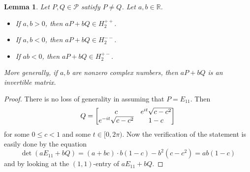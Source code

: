 \documentclass[10pt,a4paper]{amsart}
\newcommand\cP{{\mathcal{P}}}
\newtheorem{lemma}[theorem]{Lemma}
\theoremstyle{definition}
\theoremstyle{remark}
\numberwithin{subsection}{section}
\numberwithin{equation}{section}
\begin{document}
\begin{lemma}\label{apbq}
Let $P,Q\in \cP$ satisfy $P\neq Q$. Let $a,b\in \mathbb{R}$. 
\begin{itemize}
\item If $a,b>0$, then $aP+bQ\in H_2^{++}$. 
\item If $a,b<0$, then $aP+bQ\in H_2^{--}$. 
\item If $ab<0$, then $aP+bQ\in H_2^{+-}$. 
\end{itemize}
More generally, if $a,b$ are nonzero complex numbers, then $aP+bQ$ is an invertible matrix.
\end{lemma}
\begin{proof}
There is no loss of generality in assuming that $P=E_{11}$. 
Then
\[
Q=\left[ \begin{matrix} c & e^{it}\sqrt{c-c^2}  \cr e^{-it}\sqrt{c-c^2} & 1-c \cr \end{matrix} \right]
\]
for some $0\leq c<1$ and some $t\in [0,2\pi)$. 
Now the verification of the statement is easily done by the equation
\[
\det(aE_{11}+bQ) = (a+bc)\cdot b(1-c)-b^2(c-c^2) = ab(1-c)
\]
and by looking at the $(1,1)$-entry of $aE_{11}+bQ$.
\end{proof}
\end{document}

